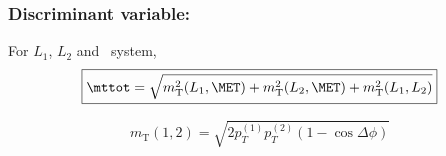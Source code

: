 \begin{frame}
\frametitle{Discriminant variable: \mttot}
\manip For $L_1$, $L_2$ and \MET\ system,
\begin{equation*}
\boxed{\mttot = \sqrt{m_{\mathrm{T}}^2(L_1,\MET) + m_{\mathrm{T}}^2(L_2,\MET) + m_{\mathrm{T}}^2(L_1,L_2)}}
\end{equation*}
\begin{minipage}[c]{.6\textwidth}
\begin{equation*}
m_{\mathrm{T}}(1,2) = \sqrt{2p_T^{(1)} p_T^{(2)} (1-\cos\Delta\phi)}
\end{equation*}
\end{minipage}
\begin{minipage}[c]{.35\textwidth}
\begin{center}
\end{center}
\end{minipage}
\end{frame}